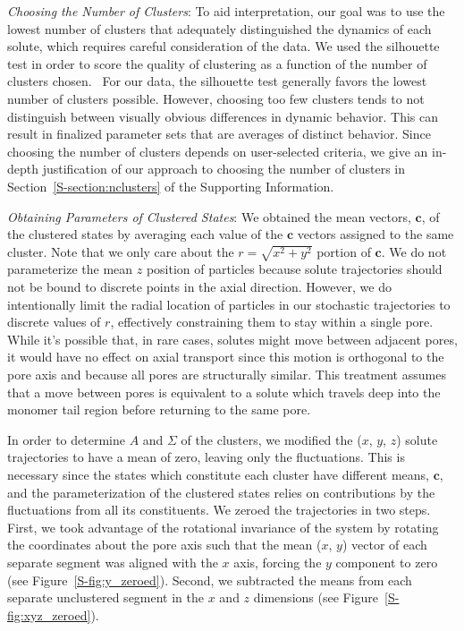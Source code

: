 \documentclass[journal=jpcbfk,manuscript=article]{achemso}
\begin{document}
  \textit{Choosing the Number of Clusters}: To aid interpretation, our goal was to
  use the lowest number of clusters that adequately distinguished the dynamics of 
  each solute, which requires careful consideration of the data. We used the silhouette
  test in order to score the quality of clustering as a function of the number of clusters
  chosen.~\cite{kaufman_finding_2009} For our data, the silhouette test generally favors 
  the lowest number of clusters possible. However, choosing too few clusters tends to not
  distinguish between visually obvious differences in dynamic behavior. This can result 
  in finalized parameter sets that are averages of distinct behavior. Since choosing 
  the number of clusters depends on user-selected criteria, we give an in-depth 
  justification of our approach to choosing the number of clusters in 
  Section~\ref{S-section:nclusters} of the Supporting Information.  
  
  \textit{Obtaining Parameters of Clustered States}: We obtained the mean vectors,
  $\mathbf{c}$, of the clustered states by averaging each value of the $\mathbf{c}$
  vectors assigned to the same cluster. Note that we only care about the 
  $r=\sqrt{x^2+y^2}$ portion of $\mathbf{c}$. We do not parameterize the mean
  $z$ position of particles because solute trajectories should not be bound to discrete
  points in the axial direction. However, we do intentionally limit the radial location 
  of particles in our stochastic trajectories to discrete values of $r$, effectively 
  constraining them to stay within a single pore. While it's possible that, in rare cases,
  solutes might move between adjacent pores, it would have no effect on axial transport
  since this motion is orthogonal to the pore axis and because all pores are structurally
  similar. This treatment assumes that a move between pores is equivalent to a solute 
  which travels deep into the monomer tail region before returning to the same pore. 
  
  In order to determine $A$ and $\Sigma$ of the clusters, we modified the 
  ($x$, $y$, $z$) solute trajectories to have a mean of zero, leaving only
  the fluctuations. This is necessary since the states which constitute each 
  cluster have different means, $\mathbf{c}$, and the parameterization of 
  the clustered states relies on contributions by the fluctuations from all
  its constituents. We zeroed the trajectories in two steps. First, we took 
  advantage of the rotational invariance of the system by rotating the coordinates
  about the pore axis such that the mean ($x$, $y$) vector of each separate 
  segment was aligned with the $x$ axis, forcing the $y$ component to zero 
  (see Figure~\ref{S-fig:y_zeroed}). Second, we subtracted the means from each
  separate unclustered segment in the $x$ and $z$ dimensions 
  (see Figure~\ref{S-fig:xyz_zeroed}). 
  
\end{document}
